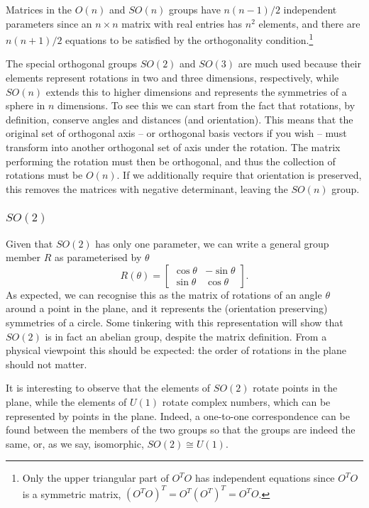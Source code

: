 \documentclass[notes.tex]{subfiles}
\begin{document}
Matrices in the $O(n)$ and $SO(n)$ groups have $n(n-1)/2$ independent parameters since an $n\times n$ matrix with real entries has $n^2$ elements, and there are $n(n+1)/2$ equations to be satisfied by the orthogonality condition.\footnote{Only the upper triangular part of $O^TO$ has independent equations since $O^TO$ is a symmetric matrix, $(O^TO)^T=O^T(O^T)^T=O^TO$. } 

The special orthogonal groups $SO(2)$ and $SO(3)$ are much used because their elements represent rotations in two and three dimensions, respectively, while $SO(n)$ extends this to higher dimensions and represents the symmetries of a sphere in $n$ dimensions. To see this we can start from the fact that rotations, by definition, conserve angles and distances (and orientation). This means that the original set of orthogonal axis -- or orthogonal basis vectors if you wish -- must transform into another orthogonal set of axis under the rotation. The matrix performing the rotation must then be orthogonal, and thus  the collection of rotations must be $O(n)$. If we additionally require that orientation is preserved, this removes the matrices with negative determinant, leaving the $SO(n)$ group.


\subsubsection{$SO(2)$}
Given that $SO(2)$ has only one parameter, we can write a general group member $R$ as parameterised by $\theta$
\[
R(\theta)=\left[\begin{matrix} \cos\theta &  -\sin\theta \\ \sin\theta&  \cos\theta \end{matrix}\right].
\]
As expected, we can recognise this as the matrix of rotations of an angle $\theta$ around a point in the plane, and it represents the (orientation preserving) symmetries of a circle. Some tinkering with this representation will show that $SO(2)$ is in fact an abelian group, despite the matrix definition. From a physical viewpoint this should be expected: the order of rotations in the plane should not matter.

It is interesting to observe that the elements of $SO(2)$ rotate points in the plane, while the elements of $U(1)$ rotate complex numbers, which can be represented by points in the plane. Indeed, a one-to-one correspondence can be found between the members of the two groups so that the groups are indeed the same, or, as we say, isomorphic, $SO(2)\cong U(1)$.
\end{document}
